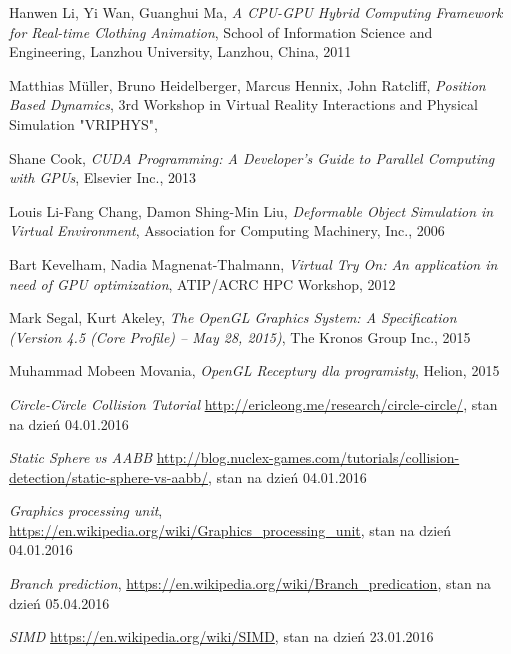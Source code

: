\begin{thebibliography}{999}

 Hanwen Li, Yi Wan, Guanghui Ma, \emph{A CPU-GPU Hybrid Computing Framework for Real-time Clothing Animation}, School of Information Science and Engineering, Lanzhou University, Lanzhou, China, 2011

 Matthias Müller, Bruno Heidelberger, Marcus Hennix, John Ratcliff, \emph{Position Based Dynamics}, 3rd Workshop in Virtual Reality Interactions and Physical Simulation "VRIPHYS", 

 Shane Cook, \emph{CUDA Programming: A Developer's Guide to Parallel Computing with GPUs}, Elsevier Inc., 2013

 Louis Li-Fang Chang, Damon Shing-Min Liu, \emph{Deformable Object Simulation in Virtual Environment}, Association for Computing Machinery, Inc., 2006

 Bart Kevelham, Nadia Magnenat-Thalmann, \emph{Virtual Try On: An application in need of GPU optimization}, ATIP/A\*CRC HPC Workshop, 2012

 Mark Segal, Kurt Akeley, \emph{The OpenGL Graphics System: A Specification (Version 4.5 (Core Profile) -- May 28, 2015)}, The Kronos Group Inc., 2015

 Muhammad Mobeen Movania, \emph{OpenGL Receptury dla programisty}, Helion, 2015

 \emph{Circle-Circle Collision Tutorial} \href{http://ericleong.me/research/circle-circle/}{http://ericleong.me/research/circle-circle/}, stan na dzień 04.01.2016

 \emph{Static Sphere vs AABB} \href{http://blog.nuclex-games.com/tutorials/collision-detection/static-sphere-vs-aabb/}{http://blog.nuclex-games.com/tutorials/collision-detection/static\allowbreak-sphere-vs-aabb/}, stan na dzień 04.01.2016

 \emph{Graphics processing unit}, \href{https://en.wikipedia.org/wiki/Graphics\_processing\_unit}{https://en.wikipedia.org/wiki/Graphics\_processing\_unit}, stan na dzień 04.01.2016

 \emph{Branch prediction}, \href{https://en.wikipedia.org/wiki/Branch\_predication}{https://en.wikipedia.org/wiki/Branch\_predication}, stan na dzień 05.04.2016

 \emph{SIMD} \href{https://en.wikipedia.org/wiki/SIMD}{https://en.wikipedia.org/wiki/SIMD}, stan na dzień 23.01.2016


\end{thebibliography}

